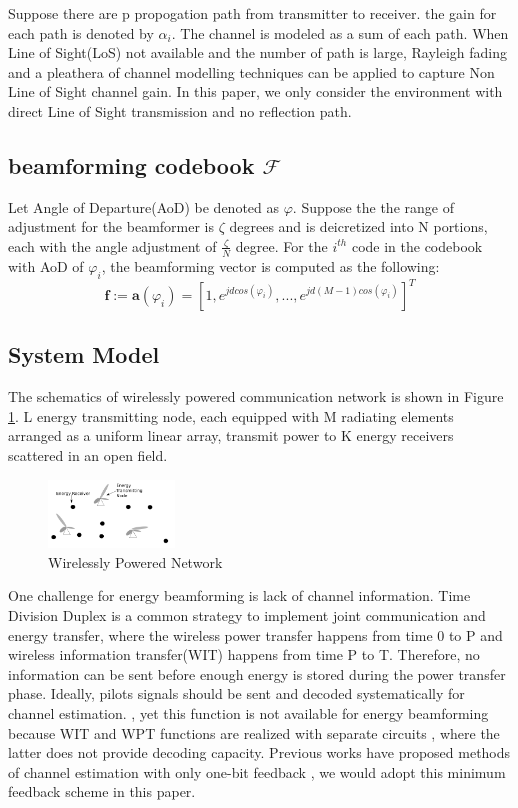 \documentclass[journal]{IEEEtran}
\begin{document}
Suppose there are p propogation path from transmitter to receiver. the gain for each path is denoted by $\alpha_i$. The channel is modeled as a sum of each path. When Line of Sight(LoS) not available and the number of path is large, Rayleigh fading and a pleathera of channel modelling techniques can be applied to capture Non Line of Sight channel gain. In this paper, we only consider the environment with direct Line of Sight transmission and no reflection path.



\subsection{beamforming codebook $\mathcal{F}$}

Let Angle of Departure(AoD) be denoted as $\varphi$. Suppose the the range of adjustment for the beamformer is $\zeta$ degrees and is deicretized into N portions, each with the angle adjustment of $\frac{\zeta}{N}$ degree. For the $i^{th}$ code in the codebook with AoD of $\varphi_i$, the beamforming vector is computed as the following:
\begin{equation}
\textbf{f} := \textbf{a}(\varphi_i)= [1,e^{jdcos(\varphi_i)},...,e^{jd(M-1)cos(\varphi_i)}]^T
\end{equation}

\subsection{System Model}

The schematics of wirelessly powered communication network is shown in Figure \ref{fig:MIMO}. L energy transmitting node, each equipped with M radiating elements arranged as a uniform linear array, transmit power to K energy receivers scattered in an open field.

\begin{figure}[H]
    \centering
    \includegraphics[width=0.3\textwidth]{6.png}
    \caption{Wirelessly Powered Network}
    \label{fig:MIMO}
\end{figure}

One challenge for energy beamforming is lack of channel information. Time Division Duplex is a common strategy to implement joint communication and energy transfer, where the wireless power transfer happens from time 0 to P and wireless information transfer(WIT) happens from time P to T. Therefore, no information can be sent before enough energy is stored during the power transfer phase. Ideally, pilots signals should be sent and decoded systematically for channel estimation. \cite{1597555}, yet this function is not available for energy beamforming because WIT and WPT functions are realized with separate circuits \cite{7462480}, where the latter does not provide decoding capacity. Previous works have proposed methods of channel estimation with only one-bit feedback \cite{6884811}, we would adopt this minimum feedback scheme in this paper.
\end{document}
